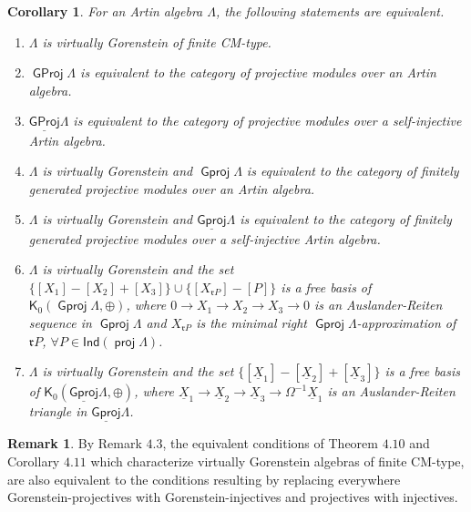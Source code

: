 \documentclass[oneside, a4paper,reqno]{amsart}
\numberwithin{equation}{section}
\newtheorem{cor}[thm]{Corollary}
\theoremstyle{definition}
\newtheorem{rem}[thm]{Remark}
\begin{document}
\begin{cor} For an Artin algebra $\Lambda$, the following statements
are equivalent.
\begin{enumerate}
\item $\Lambda$ is virtually  Gorenstein of finite CM-type.
\item ${\operatorname{\mathsf{GProj}}\nolimits}\Lambda$ is equivalent to the category of projective
modules over an Artin algebra.
\item ${\operatorname{\underline{\mathsf{GProj}}}\nolimits}\Lambda$ is equivalent to the category of projective
modules over a self-injective  Artin algebra.
\item $\Lambda$ is virtually Gorenstein and  ${\operatorname{\mathsf{Gproj}}\nolimits}\Lambda$ is equivalent to the category of finitely generated projective
modules over an Artin algebra.
\item $\Lambda$ is virtually Gorenstein and  ${\operatorname{\underline{\mathsf{Gproj}}}\nolimits}\Lambda$ is equivalent to the category of finitely generated projective
modules over a self-injective  Artin algebra.
\item $\Lambda$ is virtually Gorenstein and the set $\big\{[X_{1}]-[X_{2}]+[X_{3}]\big\} \cup
\big\{[X_{\mathfrak{r}P}]-[P] \big\}$ is a free basis of
$\mathsf{K}_{0}({\operatorname{\mathsf{Gproj}}\nolimits}\Lambda,\oplus)$, where $0 {\longrightarrow} X_{1} {\longrightarrow}
X_{2} {\longrightarrow} X_{3} {\longrightarrow} 0$ is an Auslander-Reiten sequence in
${\operatorname{\mathsf{Gproj}}\nolimits}\Lambda$ and $X_{\mathfrak{r}P}$ is the minimal right
${\operatorname{\mathsf{Gproj}}\nolimits}\Lambda$-approximation of $\mathfrak{r}P$, $\forall P \in
\mathsf{Ind}(\operatorname*{\mathsf{proj}}\Lambda)$.
\item $\Lambda$ is virtually Gorenstein and the set $\big\{[{\underline X}_{1}]-[{\underline X}_{2}]+[{\underline X}_{3}]\big\}$ is a free basis of
$\mathsf{K}_{0}({\operatorname{\underline{\mathsf{Gproj}}}\nolimits}\Lambda,\oplus)$, where $ {\underline X}_{1} {\longrightarrow}
{\underline X}_{2} {\longrightarrow} {\underline X}_{3} {\longrightarrow} \Omega^{-1}{\underline X}_{1}$ is an
Auslander-Reiten triangle in ${\operatorname{\underline{\mathsf{Gproj}}}\nolimits}\Lambda$.
\end{enumerate}
\end{cor}

\begin{rem}  By Remark $4.3$, the equivalent conditions of
Theorem $4.10$ and Corollary $4.11$ which characterize virtually
Gorenstein algebras of finite CM-type, are also equivalent to the
conditions resulting by replacing everywhere Gorenstein-projectives
with Gorenstein-injectives and projectives with injectives.
 \end{rem}
\end{document}
